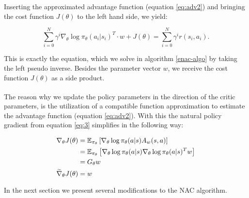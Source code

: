 \noindent Inserting the approximated advantage function (equation \ref{eq:adv2}) and bringing the cost function $J(\theta)$ to the left hand side, we yield:

\begin{equation}
	\sum_{i = 0}^{N} \gamma^i \nabla_{\theta} \log \pi_{\theta}(a_i | s_i)^T \cdot w + J(\theta) = \sum_{i = 0}^{N}\gamma^i r(s_i, a_i).
\end{equation}

\noindent This is exactly the equation, which we solve in algorithm \ref{enac-algo} by taking the left pseudo inverse. Besides the parameter vector $w$, we receive the cost function $J(\theta)$ as a side product.
\\\\
 The reason why we update the policy parameters in the direction of the critic parameters, is the utilization of a compatible function approximation to estimate the advantage function (equation \ref{eq:adv2}). With this the natural policy gradient from equation \ref{eq:3} simplifies in the following way:

\begin{align}
\nabla_\theta J(\theta) &= \operatorname{\mathbb{E}}_{\pi_{\theta}} \left[\nabla_{\theta} \log \pi_{\theta}(a|s) A_w(s, a)\right]\\
&= \operatorname{\mathbb{E}}_{\pi_{\theta}}  \left[\nabla_{\theta} \log \pi_{\theta}(a|s) \nabla_{\theta} \log \pi_{\theta}(a|s)^T w\right]\\
&= G_\theta w\\
\widetilde{\nabla}_{\theta} J(\theta) &= w
\end{align}

\noindent In the next section we present several modifications to the NAC algorithm.

